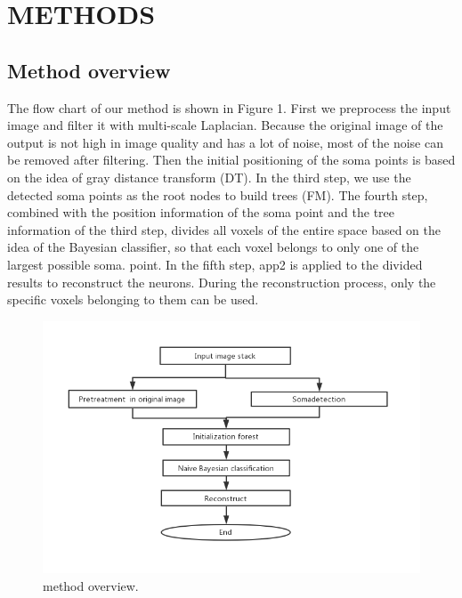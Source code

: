 \documentclass[runningheads]{llncs}
\begin{document}
\section{METHODS}

\subsection{Method overview}
The flow chart of our method is shown in Figure 1. First we preprocess the input image and filter it with multi-scale Laplacian. Because the original image of the output is not high in image quality and has a lot of noise, most of the noise can be removed after filtering. Then the initial positioning of the soma points is based on the idea of gray distance transform (DT). In the third step, we use the detected soma points as the root nodes to build trees (FM). The fourth step, combined with the position information of the soma point and the tree information of the third step, divides all voxels of the entire space based on the idea of the Bayesian classifier, so that each voxel belongs to only one of the largest possible soma. point. In the fifth step, app2 is applied to the divided results to reconstruct the neurons. During the reconstruction process, only the specific voxels belonging to them can be used.
\begin{figure}
\includegraphics[width=\textwidth]{1.png}
\caption{method overview.} \label{fig1}
\end{figure}
\end{document}
